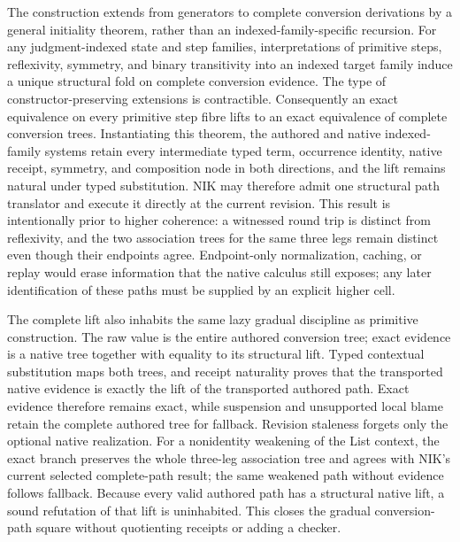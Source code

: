 \documentclass[11pt]{article}
\begin{document}
The construction extends from generators to complete conversion derivations by
a general initiality theorem, rather than an indexed-family-specific recursion.
For any judgment-indexed state and step families, interpretations of primitive
steps, reflexivity, symmetry, and binary transitivity into an indexed target
family induce a unique structural fold on complete conversion evidence.  The
type of constructor-preserving extensions is contractible.  Consequently an
exact equivalence on every primitive step fibre lifts to an exact equivalence
of complete conversion trees.  Instantiating this theorem, the authored and
native indexed-family systems retain every intermediate typed term, occurrence
identity, native receipt, symmetry, and composition node in both directions,
and the lift remains natural under typed substitution.
NIK may therefore admit one structural path translator and execute it directly
at the current revision.  This result is intentionally prior to higher
coherence: a witnessed round trip is distinct from reflexivity, and the two
association trees for the same three legs remain distinct even though their
endpoints agree.  Endpoint-only normalization, caching, or replay would erase
information that the native calculus still exposes; any later identification
of these paths must be supplied by an explicit higher cell.

The complete lift also inhabits the same lazy gradual discipline as primitive
construction.  The raw value is the entire authored conversion tree; exact
evidence is a native tree together with equality to its structural lift.
Typed contextual substitution maps both trees, and receipt naturality proves
that the transported native evidence is exactly the lift of the transported
authored path.  Exact evidence therefore remains exact, while suspension and
unsupported local blame retain the complete authored tree for fallback.
Revision staleness forgets only the optional native realization.  For a
nonidentity weakening of the List context, the exact branch preserves the
whole three-leg association tree and agrees with NIK's current selected
complete-path result; the same weakened path without evidence follows
fallback.  Because every valid authored path has a structural native lift, a
sound refutation of that lift is uninhabited.  This closes the gradual
conversion-path square without quotienting receipts or adding a checker.
\end{document}
